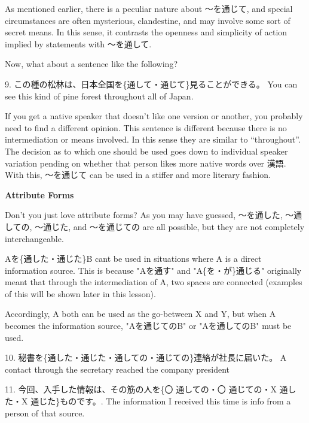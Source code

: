 \par{ As mentioned earlier, there is a peculiar nature about ～を通じて, and special circumstances are often mysterious, clandestine, and may involve some sort of secret means. In this sense, it contrasts the openness and simplicity of action implied by statements with ～を通して. }

\par{ Now, what about a sentence like the following? }

\par{9. この種の松林は、日本全国を\{通して・通じて\}見ることができる。 \hfill\break
You can see this kind of pine forest throughout all of Japan. }

\par{ If you get a native speaker that doesn't like one version or another, you probably need to find a different opinion. This sentence is different because there is no intermediation or means involved. In this sense they are similar to “throughout”. The decision as to which one should be used goes down to individual speaker variation pending on whether that person likes more native words over 漢語. With this, ～を通じて can be used in a stiffer and more literary fashion. }

\begin{center}
\textbf{Attribute Forms }
\end{center}

\par{ Don't you just love attribute forms? As you may have guessed, ～を通した, ～通しての, ～通じた, and ～を通じての are all possible, but they are not completely interchangeable. }

\par{ Aを\{通した・通じた\}B can\textquotesingle t be used in situations where A is a direct information source. This is because "Aを通す" and "A\{を・が\}通じる" originally meant that through the intermediation of A, two spaces are connected (examples of this will be shown later in this lesson). }

\par{ Accordingly, A both can be used as the go-between X and Y, but when A becomes the information source, "Aを通じてのB" or "Aを通してのB" must be used. }

\par{10. 秘書を\{通した・通じた・通しての・通じての\}連絡が社長に届いた。 \hfill\break
A contact through the secretary reached the company president }

\par{11. 今回、入手した情報は、その筋の人を\{〇 通しての・〇 通じての・X 通した・X 通じた\}ものです。. \hfill\break
The information I received this time is info from a person of that source. }

